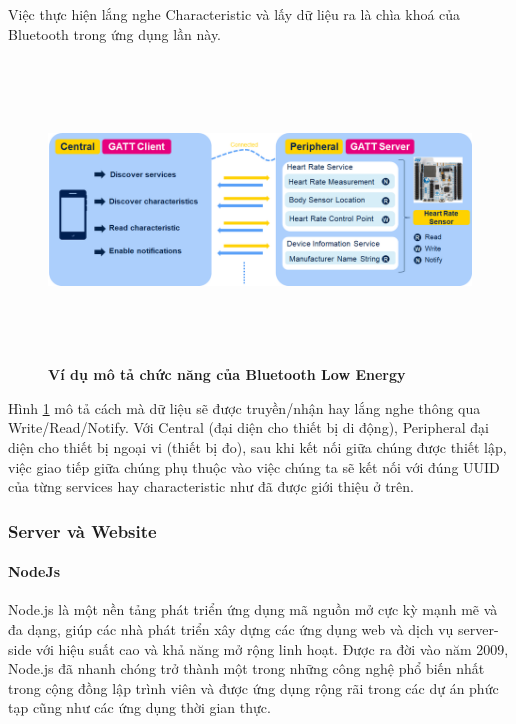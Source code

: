 Việc thực hiện lắng nghe Characteristic và lấy dữ liệu ra là chìa khoá của Bluetooth trong ứng dụng lần này.
  \begin{figure}[H]
        \centering
        \includegraphics[width=16cm,height=8cm]{Images/system/ble_services.png}
        \caption[Ví dụ mô tả chức năng của Bluetooth Low Energy]{\bfseries \fontsize{12pt}{0pt}
        \selectfont Ví dụ mô tả chức năng của Bluetooth Low Energy}
        \label{ble_services} %
  \end{figure}

  Hình \ref{ble_services} mô tả cách mà dữ liệu sẽ được truyền/nhận hay lắng nghe thông qua Write/Read/Notify. 
  Với Central (đại diện cho thiết bị di động), Peripheral đại diện cho thiết bị ngoại vi (thiết bị đo), sau khi kết nối giữa chúng 
  được thiết lập, việc giao tiếp giữa chúng phụ thuộc vào việc chúng ta sẽ kết nối với đúng UUID của từng services hay
  characteristic như đã được giới thiệu ở trên.

\subsubsection{Server và Website}

\paragraph{NodeJs}
\mbox{}

Node.js là một nền tảng phát triển ứng dụng mã nguồn mở cực kỳ mạnh mẽ và đa dạng, giúp các nhà phát triển xây dựng các ứng dụng web và dịch vụ server-side với hiệu suất cao và khả năng mở rộng linh hoạt. Được ra đời vào năm 2009, Node.js đã nhanh chóng trở thành một trong những công nghệ phổ biến nhất trong cộng đồng lập trình viên và được ứng dụng rộng rãi trong các dự án phức tạp cũng như các ứng dụng thời gian thực.

